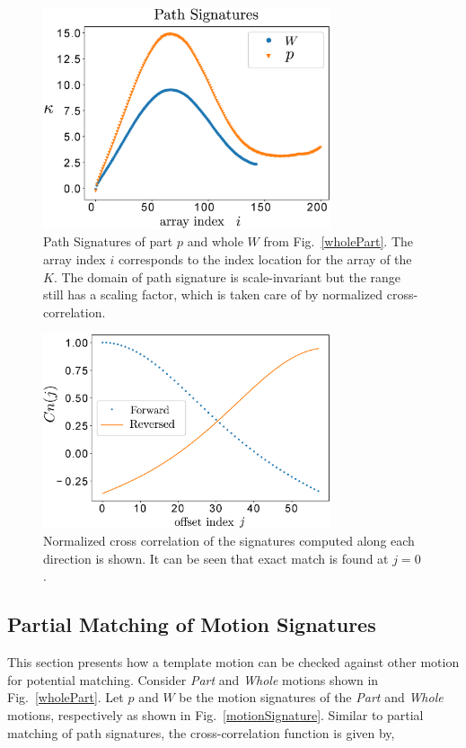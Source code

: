 \documentclass[twocolumn,10pt]{asme2ej}
\begin{document}
\begin{figure}
\centering
\includegraphics[width=240pt]{figure/fig_path_signatures.eps}
  \caption{Path Signatures of part $p$ and whole $W$ from Fig.~\ref{wholePart}. The array index $i$ corresponds to the index location for the array of the $K$. The domain of path signature is scale-invariant but the range still has a scaling factor, which is taken care of by normalized cross-correlation.}
\label{pathSignature}
\end{figure}

\begin{figure}
\centering
\includegraphics[width=240pt]{figure/fig_ncc.eps}
  \caption{Normalized cross correlation of the signatures computed along each direction is shown. It can be seen that exact match is found at $j=0$.}
\label{ncc}
\end{figure}

\subsection{Partial Matching of Motion Signatures}\label{sec_mcc}
This section presents how a template motion can be checked against other motion for potential matching.
Consider \emph{Part} and \emph{Whole} motions shown in Fig.~\ref{wholePart}.
Let $p$ and $W$ be the motion signatures of the \emph{Part} and \emph{Whole} motions, respectively as shown in Fig.~\ref{motionSignature}.
Similar to partial matching of path signatures, the cross-correlation function is given by,
\end{document}
